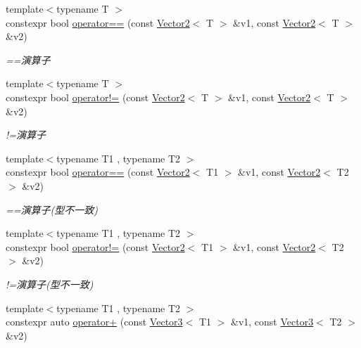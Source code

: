\begin{DoxyCompactItemize}
{\footnotesize template$<$typename T $>$ }\\constexpr bool \mbox{\hyperlink{namespacesaki_aebe3f4c69f62ec8edc68723c5194c3b9}{operator==}} (const \mbox{\hyperlink{classsaki_1_1_vector2}{Vector2}}$<$ T $>$ \&v1, const \mbox{\hyperlink{classsaki_1_1_vector2}{Vector2}}$<$ T $>$ \&v2)
\begin{DoxyCompactList}\small\item\em ==演算子 \end{DoxyCompactList}\item 
{\footnotesize template$<$typename T $>$ }\\constexpr bool \mbox{\hyperlink{namespacesaki_a6ff1956703c2dfeebb0d188d9c34b033}{operator!=}} (const \mbox{\hyperlink{classsaki_1_1_vector2}{Vector2}}$<$ T $>$ \&v1, const \mbox{\hyperlink{classsaki_1_1_vector2}{Vector2}}$<$ T $>$ \&v2)
\begin{DoxyCompactList}\small\item\em !=演算子 \end{DoxyCompactList}\item 
{\footnotesize template$<$typename T1 , typename T2 $>$ }\\constexpr bool \mbox{\hyperlink{namespacesaki_a033d4b861140a6c00a8cb56ad71d463a}{operator==}} (const \mbox{\hyperlink{classsaki_1_1_vector2}{Vector2}}$<$ T1 $>$ \&v1, const \mbox{\hyperlink{classsaki_1_1_vector2}{Vector2}}$<$ T2 $>$ \&v2)
\begin{DoxyCompactList}\small\item\em ==演算子(型不一致) \end{DoxyCompactList}\item 
{\footnotesize template$<$typename T1 , typename T2 $>$ }\\constexpr bool \mbox{\hyperlink{namespacesaki_a778d46d9fe6118407c686cc3c3c61ac7}{operator!=}} (const \mbox{\hyperlink{classsaki_1_1_vector2}{Vector2}}$<$ T1 $>$ \&v1, const \mbox{\hyperlink{classsaki_1_1_vector2}{Vector2}}$<$ T2 $>$ \&v2)
\begin{DoxyCompactList}\small\item\em !=演算子(型不一致) \end{DoxyCompactList}\item 
{\footnotesize template$<$typename T1 , typename T2 $>$ }\\constexpr auto \mbox{\hyperlink{namespacesaki_a482be906f8ccfd7fa303391e28e44f05}{operator+}} (const \mbox{\hyperlink{classsaki_1_1_vector3}{Vector3}}$<$ T1 $>$ \&v1, const \mbox{\hyperlink{classsaki_1_1_vector3}{Vector3}}$<$ T2 $>$ \&v2)

\end{DoxyCompactItemize}
